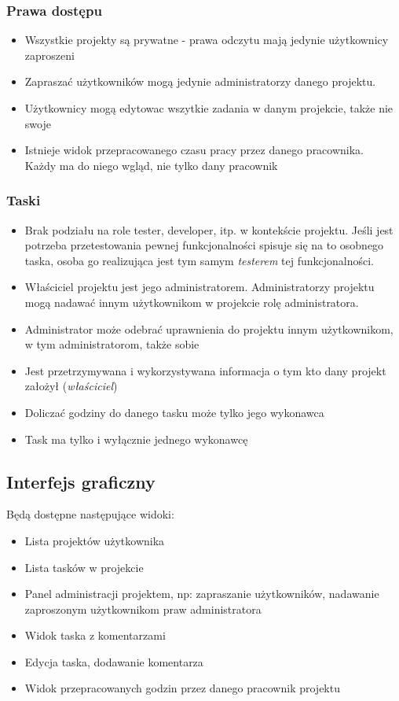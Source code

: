 \documentclass[a4paper,12pt,notitlepage]{mwrep}
\begin{document}
\subsubsection{Prawa dostępu}
\begin{itemize}
	\item	Wszystkie projekty są prywatne - prawa odczytu mają jedynie użytkownicy zaproszeni
	\item	Zapraszać użytkowników mogą jedynie administratorzy danego projektu.
	\item	Użytkownicy mogą edytowac wszytkie zadania w danym projekcie, także nie swoje
	\item	Istnieje widok przepracowanego czasu pracy przez danego pracownika.\\
			Każdy ma do niego wgląd, nie tylko dany pracownik
\end{itemize}

\subsubsection{Taski}
\begin{itemize}
	\item	Brak podziału na role tester, developer, itp. w kontekście projektu.
			Jeśli jest potrzeba przetestowania pewnej funkcjonalności spisuje się na to osobnego taska,
			osoba go realizująca jest tym samym \emph{testerem} tej funkcjonalności.
	\item	Właściciel projektu jest jego administratorem. Administratorzy projektu mogą nadawać innym
			użytkownikom w projekcie rolę administratora.
	\item	Administrator może odebrać uprawnienia do projektu innym użytkownikom, w tym administratorom,
			także sobie
	\item	Jest przetrzymywana i wykorzystywana informacja o tym kto dany projekt założył (\emph{właściciel})
	\item	Doliczać godziny do danego tasku może tylko jego wykonawca
	\item	Task ma tylko i wyłącznie jednego wykonawcę
\end{itemize}


\subsection{Interfejs graficzny}
Będą dostępne następujące widoki:
\begin{itemize}
	\item	Lista projektów użytkownika
	\item	Lista tasków w projekcie
	\item	Panel administracji projektem, np: zapraszanie użytkowników,
			nadawanie zaproszonym użytkownikom praw administratora
	\item	Widok taska z komentarzami
	\item	Edycja taska, dodawanie komentarza
	\item	Widok przepracowanych godzin przez danego pracownik projektu
\end{itemize}
\end{document}
